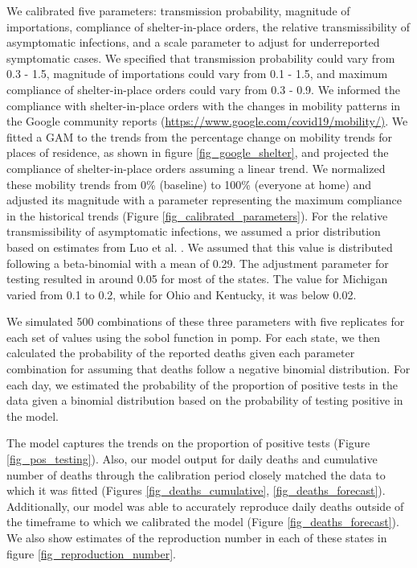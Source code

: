 \documentclass[11pt]{article}
\begin{document}
We calibrated five parameters: transmission probability, magnitude of importations, compliance of shelter-in-place orders, the relative transmissibility of asymptomatic infections, and a scale parameter to adjust for underreported symptomatic cases. We specified that transmission probability could vary from 0.3 - 1.5, magnitude of importations could vary from 0.1 - 1.5, and maximum compliance of shelter-in-place orders could vary from 0.3 - 0.9. We informed the compliance with shelter-in-place orders with the changes in mobility patterns in the Google community reports (\url{https://www.google.com/covid19/mobility/)}. We fitted a GAM to the trends from the percentage change on mobility trends for places of residence, as shown in figure \ref{fig_google_shelter}, and projected the compliance of shelter-in-place orders assuming a linear trend. We normalized these mobility trends from 0\% (baseline) to 100\% (everyone at home) and adjusted its magnitude with a parameter representing the maximum compliance in the historical trends (Figure \ref{fig_calibrated_parameters}). For the relative transmissibility of asymptomatic infections, we assumed a prior distribution based on estimates from Luo et al. \cite{Luo2020_Contact_MedRxiv}. We assumed that this value is distributed following a beta-binomial with a mean of 0.29. The adjustment parameter for testing resulted in around 0.05 for most of the states. The value for Michigan varied from 0.1 to 0.2, while for Ohio and Kentucky, it was below 0.02. 

We simulated 500 combinations of these three parameters with five replicates for each set of values using the sobol function in pomp. For each state, we then calculated the probability of the reported deaths given each parameter combination for assuming that deaths follow a negative binomial distribution. For each day, we estimated the probability of the proportion of positive tests in the data given a binomial distribution based on the probability of testing positive in the model. 

The model captures the trends on the proportion of positive tests (Figure \ref{fig_pos_testing}). Also, our model output for daily deaths and cumulative number of deaths through the calibration period closely matched the data to which it was fitted (Figures \ref{fig_deaths_cumulative}, \ref{fig_deaths_forecast}). Additionally, our model was able to accurately reproduce daily deaths outside of the timeframe to which we calibrated the model (Figure \ref{fig_deaths_forecast}). We also show estimates of the reproduction number in each of these states in figure \ref{fig_reproduction_number}. 
\end{document}
